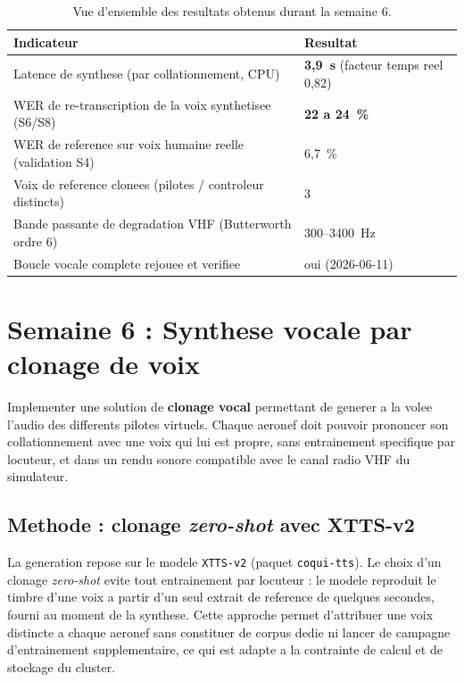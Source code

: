 \documentclass[11pt,a4paper]{article}
\begin{document}
\begin{table}[h]
\centering
\small
\begin{tabular}{>{\raggedright}p{8.7cm} l}
\toprule
\rowcolor{lightgray}\textbf{Indicateur} & \textbf{Resultat}\\
\midrule
Latence de synthese (par collationnement, CPU) & \textbf{3,9~s} (facteur temps reel 0,82)\\
WER de re-transcription de la voix synthetisee (S6/S8) & \textbf{22 a 24~\%}\\
WER de reference sur voix humaine reelle (validation S4) & 6,7~\%\\
Voix de reference clonees (pilotes / controleur distincts) & 3\\
Bande passante de degradation VHF (Butterworth ordre 6) & 300--3400~Hz\\
Boucle vocale complete rejouee et verifiee & oui (2026-06-11)\\
\bottomrule
\end{tabular}
\caption{Vue d'ensemble des resultats obtenus durant la semaine 6.}
\end{table}

\section{Semaine 6 : Synthese vocale par clonage de voix}

\begin{objbox}
Implementer une solution de \textbf{clonage vocal} permettant de generer a la volee
l'audio des differents pilotes virtuels. Chaque aeronef doit pouvoir prononcer son
collationnement avec une voix qui lui est propre, sans entrainement specifique par
locuteur, et dans un rendu sonore compatible avec le canal radio VHF du simulateur.
\end{objbox}

\subsection{Methode : clonage \emph{zero-shot} avec XTTS-v2}

La generation repose sur le modele \texttt{XTTS-v2} (paquet \texttt{coqui-tts}). Le
choix d'un clonage \emph{zero-shot} evite tout entrainement par locuteur : le modele
reproduit le timbre d'une voix a partir d'un seul extrait de reference de quelques
secondes, fourni au moment de la synthese. Cette approche permet d'attribuer une
voix distincte a chaque aeronef sans constituer de corpus dedie ni lancer de
campagne d'entrainement supplementaire, ce qui est adapte a la contrainte de calcul
et de stockage du cluster.
\end{document}
